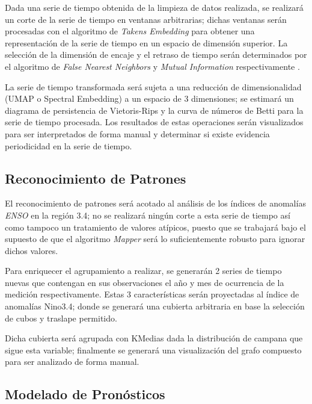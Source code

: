 \documentclass{article}
\begin{document}
            Dada una serie de tiempo obtenida de la limpieza de datos realizada, se realizará un corte de la serie de tiempo en ventanas arbitrarias; dichas ventanas serán procesadas con el algoritmo de \textit{Takens Embedding} para obtener una representación de la serie de tiempo en un espacio de dimensión superior. La selección de la dimensión de encaje y el retraso de tiempo serán determinados por el algoritmo de \textit{False Nearest Neighbors} y \textit{Mutual Information} respectivamente \cite{perea-time-series-tda}.

            La serie de tiempo transformada será sujeta a una reducción de dimensionalidad (UMAP o Spectral Embedding) a un espacio de 3 dimensiones; se estimará un diagrama de persistencia de Vietoris-Rips y la curva de números de Betti para la serie de tiempo procesada. Los resultados de estas operaciones serán visualizados para ser interpretados de forma manual y determinar si existe evidencia periodicidad en la serie de tiempo.

        \subsection{Reconocimiento de Patrones}

            El reconocimiento de patrones será acotado al análisis de los índices de anomalías \textit{ENSO} en la región 3.4; no se realizará ningún corte a esta serie de tiempo así como tampoco un tratamiento de valores atípicos, puesto que se trabajará bajo el supuesto de que el algoritmo \textit{Mapper} será lo suficientemente robusto para ignorar dichos valores.

            Para enriquecer el agrupamiento a realizar, se generarán 2 series de tiempo nuevas que contengan en sus observaciones el año y mes de ocurrencia de la medición respectivamente. Estas 3 características serán proyectadas al índice de anomalías Nino3.4; donde se generará una cubierta arbitraria en base la selección de cubos y traslape permitido.

            Dicha cubierta será agrupada con KMedias dada la distribución de campana que sigue esta variable; finalmente se generará una visualización del grafo compuesto para ser analizado de forma manual.

        \subsection{Modelado de Pronósticos}
\end{document}
